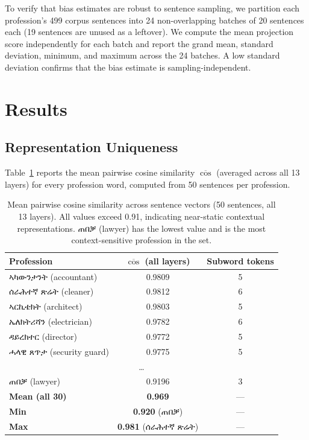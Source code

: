 To verify that bias estimates are robust to sentence sampling, we partition
each profession's 499 corpus sentences into 24 non-overlapping batches of
20 sentences each (19 sentences are unused as a leftover). We compute the mean
projection score independently for each batch and report the grand mean,
standard deviation, minimum, and maximum across the 24 batches. A low standard
deviation confirms that the bias estimate is sampling-independent.


\section{Results}

\subsection{Representation Uniqueness}

Table~\ref{tab:mean_cos} reports the mean pairwise cosine similarity
$\overline{\cos}$ (averaged across all 13 layers) for every profession word,
computed from 50 sentences per profession.

\begin{table}[h]
\centering
\small
\begin{tabular}{lcc}
\toprule
\textbf{Profession} & \textbf{$\overline{\cos}$ (all layers)} & \textbf{Subword tokens} \\
\midrule
ኣካውንታንት  (accountant)     & 0.9809 & 5 \\
ሰራሕተኛ ጽሬት (cleaner)       & 0.9812 & 6 \\
ኣርኪቴክት   (architect)      & 0.9803 & 5 \\
ኤለክትሪሻን  (electrician)    & 0.9782 & 6 \\
ዳይረክተር   (director)       & 0.9772 & 5 \\
ሓላዊ ጸጥታ  (security guard)  & 0.9775 & 5 \\
\midrule
\multicolumn{3}{c}{\ldots} \\
\midrule
ጠበቓ       (lawyer)        & 0.9196 & 3 \\
\midrule
\textbf{Mean (all 30)}     & \textbf{0.969} & --- \\
\textbf{Min}               & \textbf{0.920} (ጠበቓ) & --- \\
\textbf{Max}               & \textbf{0.981} (ሰራሕተኛ ጽሬት) & --- \\
\bottomrule
\end{tabular}
\caption{Mean pairwise cosine similarity across sentence vectors (50 sentences,
all 13 layers). All values exceed 0.91, indicating near-static contextual
representations. ጠበቓ (lawyer) has the lowest value and is the most
context-sensitive profession in the set.}
\label{tab:mean_cos}
\end{table}

